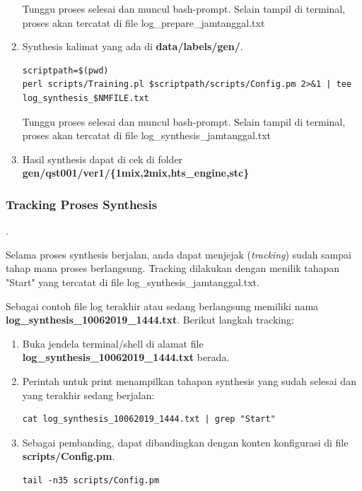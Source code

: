 \documentclass[12pt,]{article}
\begin{document}
\begin{enumerate}
		Tunggu proses selesai dan muncul bash-prompt.
		Selain tampil di terminal, proses akan tercatat di file log\_prepare\_jamtanggal.txt

		\item Synthesis kalimat yang ada di \textbf{data/labels/gen/}.
		\begin{verbatim}
scriptpath=$(pwd)
perl scripts/Training.pl $scriptpath/scripts/Config.pm 2>&1 | tee log_synthesis_$NMFILE.txt
		\end{verbatim}

		Tunggu proses selesai dan muncul bash-prompt.
		Selain tampil di terminal, proses akan tercatat di file log\_synthesis\_jamtanggal.txt

		\item Hasil synthesis dapat di cek di folder \textbf{gen/qst001/ver1/\{1mix,2mix,hts\_engine,stc\}}

	\end{enumerate}

	\newpage
	\subsubsection{Tracking Proses Synthesis}.

	Selama proses synthesis berjalan, anda dapat menjejak (\textit{tracking}) sudah sampai tahap mana proses berlangsung.
	Tracking dilakukan dengan menilik tahapan "Start" yang tercatat di file log\_synthesis\_jamtanggal.txt.

	Sebagai contoh file log terakhir atau sedang berlangsung memiliki nama \textbf{log\_synthesis\_10062019\_1444.txt}.
	Berikut langkah tracking:

	\begin{enumerate}
		\item Buka jendela terminal/shell di alamat file \textbf{log\_synthesis\_10062019\_1444.txt} berada.

		\item Perintah untuk print menampilkan tahapan synthesis yang sudah selesai dan yang terakhir sedang berjalan:
		\begin{verbatim}
cat log_synthesis_10062019_1444.txt | grep "Start"
		\end{verbatim}

		\item Sebagai pembanding, dapat dibandingkan dengan konten konfigurasi di file \textbf{scripts/Config.pm}.
		\begin{verbatim}
tail -n35 scripts/Config.pm
		\end{verbatim}

	\end{enumerate}
\end{document}

